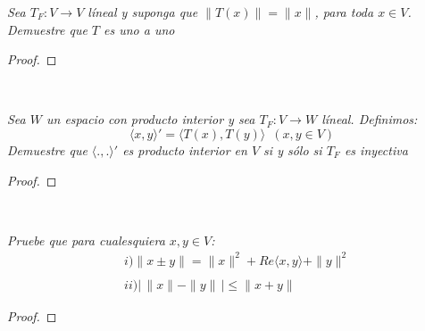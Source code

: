 \documentclass[11pt,letterpaper]{article}
\begin{document}
\begin{tcolorbox}[
	title = \textcolor{black}{\textcolor{white}{Problema 1}},]
\textit{Sea $T_F:V\rightarrow V$ l\'ineal y suponga que $\|T(x)\|=\|x\|$, para toda $x\in V$. Demuestre que $T$ es uno a uno
}
\end{tcolorbox}
\begin{proof}
    
\end{proof}\,\\
\begin{tcolorbox}[
	title = \textcolor{black}{\textcolor{white}{Problema 2}},]
\textit{Sea $W$ un espacio con producto interior y sea $T_F:V\rightarrow W$ l\'ineal.
Definimos:\,\\
\begin{equation*}
    \langle x,y\rangle'=\langle T(x),T(y)\rangle\,\,\,(x,y\in V) 
\end{equation*}
Demuestre que $\langle.,. \rangle'$ es producto interior en $V$ si y s\'olo si $T_F$ es inyectiva}
\end{tcolorbox}
\begin{proof}
    
\end{proof}\,\\
\begin{tcolorbox}[
	title = \textcolor{black}{\textcolor{white}{Problema 3}},]
\textit{Pruebe que para cualesquiera $x,y\in V$:\,\\
\begin{align*}
    &i)\|x\pm y\|=\|x\|^2+Re\langle x,y\rangle+\|y\|^2\,\\
    \,\\
    &ii)|\,\|x\|-\|y\|\,|\leq \|x+y\|
\end{align*}
}
\end{tcolorbox}
\begin{proof}
	
\end{proof}\,\\
\end{document}
